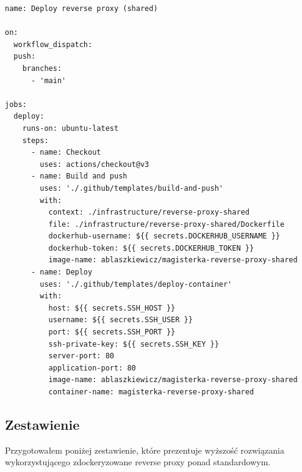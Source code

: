 \documentclass{article}
\begin{document}
\begin{lstlisting}[caption=Plik \texttt{.github/workflows/shared-deploy-reverse-proxy.yml}]
name: Deploy reverse proxy (shared)

on:
  workflow_dispatch:
  push:
    branches:
      - 'main'

jobs:
  deploy:
    runs-on: ubuntu-latest
    steps:
      - name: Checkout
        uses: actions/checkout@v3
      - name: Build and push
        uses: './.github/templates/build-and-push'
        with:
          context: ./infrastructure/reverse-proxy-shared
          file: ./infrastructure/reverse-proxy-shared/Dockerfile
          dockerhub-username: ${{ secrets.DOCKERHUB_USERNAME }}
          dockerhub-token: ${{ secrets.DOCKERHUB_TOKEN }}
          image-name: ablaszkiewicz/magisterka-reverse-proxy-shared
      - name: Deploy
        uses: './.github/templates/deploy-container'
        with:
          host: ${{ secrets.SSH_HOST }}
          username: ${{ secrets.SSH_USER }}
          port: ${{ secrets.SSH_PORT }}
          ssh-private-key: ${{ secrets.SSH_KEY }}
          server-port: 80
          application-port: 80
          image-name: ablaszkiewicz/magisterka-reverse-proxy-shared
          container-name: magisterka-reverse-proxy-shared

\end{lstlisting}

\subsection{Zestawienie}

Przygotowałem poniżej zestawienie, które prezentuje wyższość rozwiązania wykorzystującego zdockeryzowane reverse proxy ponad standardowym.
\end{document}
